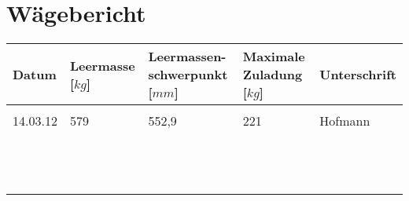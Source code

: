 \section{Wägebericht}
\begin{tiny}
\begin{tabular}{|m{}|m{}|m{2cm}|m{}|m{}|}
\hline
Datum & Leermasse [$kg$] & Leermassen- schwerpunkt [$mm$]  & Maximale Zuladung [$kg$] & Unterschrift\\

\hline

& & & &\\
14.03.12 & 579 & 552,9 & 221 & Hofmann\\
& & & &\\
\hline
& & & &\\
& & & &\\
& & & &\\
\hline
& & & &\\
& & & &\\
& & & &\\
\hline
& & & &\\
& & & &\\
& & & &\\
\hline
& & & &\\
& & & &\\
& & & &\\
\hline

\end{tabular}
\end{tiny}
%
%
